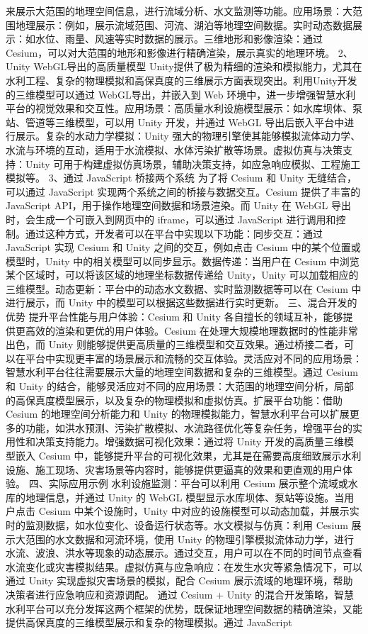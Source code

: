 {{{来展示大范围的地理空间信息，进行流域分析、水文监测等功能。应用场景：大范围地理展示：例如，展示流域范围、河流、湖泊等地理空间数据。实时动态数据展示：如水位、雨量、风速等实时数据的展示。三维地形和影像渲染：通过 Cesium，可以对大范围的地形和影像进行精确渲染，展示真实的地理环境。 2、Unity WebGL导出的高质量模型 Unity提供了极为精细的渲染和模拟能力，尤其在水利工程、复杂的物理模拟和高保真度的三维展示方面表现突出。利用Unity开发的三维模型可以通过 WebGL导出，并嵌入到 Web 环境中，进一步增强智慧水利平台的视觉效果和交互性。应用场景：高质量水利设施模型展示：如水库坝体、泵站、管道等三维模型，可以用 Unity 开发，并通过 WebGL 导出后嵌入平台中进行展示。复杂的水动力学模拟：Unity 强大的物理引擎使其能够模拟流体动力学、水流与环境的互动，适用于水流模拟、水体污染扩散等场景。虚拟仿真与决策支持：Unity 可用于构建虚拟仿真场景，辅助决策支持，如应急响应模拟、工程施工模拟等。 3、通过 JavaScript 桥接两个系统 为了将 Cesium 和 Unity 无缝结合，可以通过 JavaScript 实现两个系统之间的桥接与数据交互。Cesium 提供了丰富的 JavaScript API，用于操作地理空间数据和场景渲染。而 Unity 在 WebGL 导出时，会生成一个可嵌入到网页中的 iframe，可以通过 JavaScript 进行调用和控制。通过这种方式，开发者可以在平台中实现以下功能：同步交互：通过 JavaScript 实现 Cesium 和 Unity 之间的交互，例如点击 Cesium 中的某个位置或模型时，Unity 中的相关模型可以同步显示。数据传递：当用户在 Cesium 中浏览某个区域时，可以将该区域的地理坐标数据传递给 Unity，Unity 可以加载相应的三维模型。动态更新：平台中的动态水文数据、实时监测数据等可以在 Cesium 中进行展示，而 Unity 中的模型可以根据这些数据进行实时更新。 三、混合开发的优势 提升平台性能与用户体验：Cesium 和 Unity 各自擅长的领域互补，能够提供更高效的渲染和更优的用户体验。Cesium 在处理大规模地理数据时的性能非常出色，而 Unity 则能够提供更高质量的三维模型和交互效果。通过桥接二者，可以在平台中实现更丰富的场景展示和流畅的交互体验。灵活应对不同的应用场景：智慧水利平台往往需要展示大量的地理空间数据和复杂的三维模型。通过 Cesium 和 Unity 的结合，能够灵活应对不同的应用场景：大范围的地理空间分析，局部的高保真度模型展示，以及复杂的物理模拟和虚拟仿真。扩展平台功能：借助 Cesium 的地理空间分析能力和 Unity 的物理模拟能力，智慧水利平台可以扩展更多的功能，如洪水预测、污染扩散模拟、水流路径优化等复杂任务，增强平台的实用性和决策支持能力。增强数据可视化效果：通过将 Unity 开发的高质量三维模型嵌入 Cesium 中，能够提升平台的可视化效果，尤其是在需要高度细致展示水利设施、施工现场、灾害场景等内容时，能够提供更逼真的效果和更直观的用户体验。 四、实际应用示例 水利设施监测：平台可以利用 Cesium 展示整个流域或水库的地理信息，并通过 Unity 的 WebGL 模型显示水库坝体、泵站等设施。当用户点击 Cesium 中某个设施时，Unity 中对应的设施模型可以动态加载，并展示实时的监测数据，如水位变化、设备运行状态等。水文模拟与仿真：利用 Cesium 展示大范围的水文数据和河流环境，使用 Unity 的物理引擎模拟流体动力学，进行水流、波浪、洪水等现象的动态展示。通过交互，用户可以在不同的时间节点查看水流变化或灾害模拟结果。虚拟仿真与应急响应：在发生水灾等紧急情况下，可以通过 Unity 实现虚拟灾害场景的模拟，配合 Cesium 展示流域的地理环境，帮助决策者进行应急响应和资源调配。 通过 Cesium + Unity 的混合开发策略，智慧水利平台可以充分发挥这两个框架的优势，既保证地理空间数据的精确渲染，又能提供高保真度的三维模型展示和复杂的物理模拟。通过 JavaScript }}}
